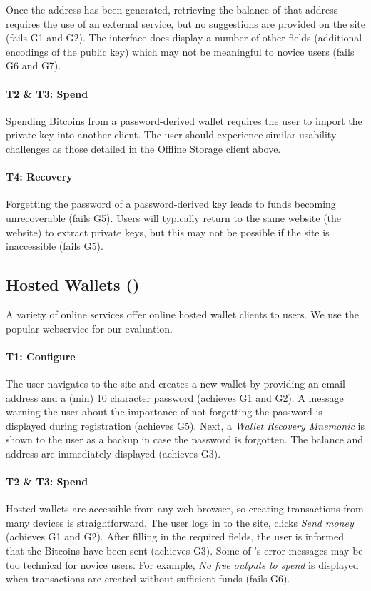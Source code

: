 Once the address has been generated, retrieving the balance of that address requires the use of an external service, but no suggestions are provided on the site (fails G1 and G2). The interface does display a number of other fields (\eg additional encodings of the public key) which may not be meaningful to novice users (fails G6 and G7). 

\paragraph{T2 \& T3: Spend} Spending Bitcoins from a password-derived wallet requires the user to import the private key into another client. The user should experience similar usability challenges as those detailed in the Offline Storage client above.

\paragraph{T4: Recovery} Forgetting the password of a password-derived key leads to funds becoming unrecoverable (fails G5). Users will typically return to the same website (\ie the \brain website) to extract private keys, but this may not be possible if the site is inaccessible (fails G5). 

\subsection{Hosted Wallets (\block)}
\label{hosted}
A variety of online services offer online hosted wallet clients to users. We use the popular \block webservice for our evaluation.

\paragraph{T1: Configure} The user navigates to the \block site and creates a new wallet by providing an email address and a (min) 10 character password (achieves G1 and G2). A message warning the user about the importance of not forgetting the password is displayed during registration (achieves G5). Next, a \emph{Wallet Recovery Mnemonic} is shown to the user as a backup in case the password is forgotten. The balance and address are immediately displayed (achieves G3). 

\paragraph{T2 \& T3: Spend}
\label{hosted transaction} 
Hosted wallets are accessible from any web browser, so creating transactions from many devices is straightforward. The user logs in to the site, clicks \emph{Send money} (achieves G1 and G2). After filling in the required fields, the user is informed that the Bitcoins have been sent (achieves G3). Some of \block 's error messages may be too technical for novice users. For example, \emph{No free outputs to spend} is displayed when transactions are created without sufficient funds (fails G6). 

